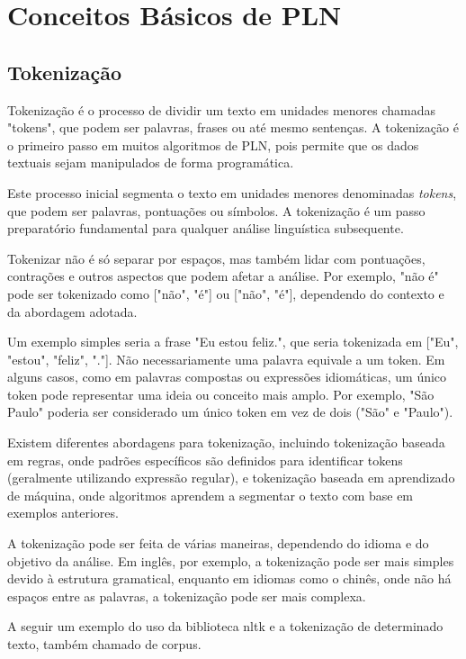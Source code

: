 \documentclass[14pt,a4paper,oneside]{book}
\begin{document}
\section{Conceitos Básicos de PLN}

\subsection{Tokenização}

Tokenização é o processo de dividir um texto em unidades menores chamadas "tokens", que podem ser palavras, frases ou até mesmo sentenças. A tokenização é o primeiro passo em muitos algoritmos de PLN, pois permite que os dados textuais sejam manipulados de forma 
programática.

Este processo inicial segmenta o texto em unidades menores denominadas \textit{tokens}, que podem ser palavras, pontuações ou símbolos. A tokenização é um passo preparatório fundamental para qualquer análise linguística subsequente. 

Tokenizar não é só separar por espaços, mas também lidar com pontuações, contrações e outros aspectos que podem afetar a análise. Por exemplo, "não é" pode ser tokenizado como ["não", "é"] ou ["não", "é"], dependendo do contexto e da abordagem adotada. 

Um exemplo simples seria a frase "Eu estou feliz.", que seria tokenizada em ["Eu", "estou", "feliz", "."]. Não necessariamente uma palavra equivale a um token. Em alguns casos, como em palavras compostas ou expressões idiomáticas, um único token pode representar uma ideia ou conceito mais amplo. Por exemplo, "São Paulo" poderia ser considerado um único token em vez de dois ("São" e "Paulo"). 

Existem diferentes abordagens para tokenização, incluindo tokenização baseada em regras, onde padrões específicos são definidos para identificar tokens (geralmente utilizando expressão regular), e tokenização baseada em aprendizado de máquina, onde algoritmos aprendem a segmentar o texto com base em exemplos anteriores.

A tokenização pode ser feita de várias maneiras, dependendo do idioma e do objetivo da análise. Em inglês, por exemplo, a tokenização pode ser mais simples devido à estrutura gramatical, enquanto em idiomas como o chinês, onde não há espaços entre as palavras, a tokenização pode ser mais complexa.


A seguir um exemplo do uso da biblioteca nltk e a tokenização de determinado texto, também chamado de corpus.
\end{document}
